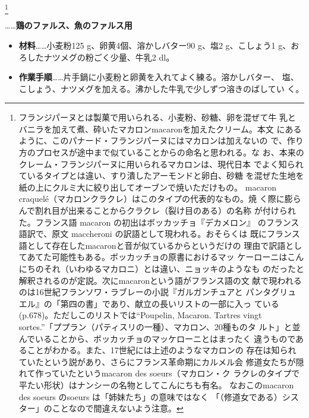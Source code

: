\begin{recette}
\footnote{フランジパーヌとは製菓で用いられる、小麦粉、砂糖、卵を混ぜて牛
  乳とバニラを加えて煮、砕いたマカロンmacaronを加えたクリーム。本文
  にあるように、このパナード・フランジパーヌにはマカロンは加えないの
  で、作り方のプロセスが途中まで似ていることからの命名と思われる。な
  お、本来のクレーム・フランジパーヌに用いられるマカロンは、現代日本
  でよく知られているタイプとは違い、すり潰したアーモンドと卵白、砂糖
  を混ぜた生地を紙の上にクルミ大に絞り出してオーブンで焼いただけもの。
  macaron craquelé（マカロンクラクレ）はこのタイプの代表的なもの。焼
  く際に膨らんで割れ目が出来ることからクラクレ（裂け目のある）の名称
  が付けられた。フランス語 macaron の初出はボッカッチョ『デカメロン』
  のフランス語訳で、原文 maccheroni の訳語として現われる。おそらくは
  既にフランス語として存在したmacaronと音が似ているからというだけの
  理由で訳語としてあてた可能性もある。ボッカッチョの原書におけるマッ
  ケーローニはこんにちのそれ（いわゆるマカロニ）とは違い、ニョッキのようなも
  のだったと解釈されるのが定説。次にmacaronという語がフランス語の文
  献で現われるのは16世紀フランソワ・ラブレーの小説『ガルガンチュアと
  パンタグリュエル』の「第四の書」であり、献立の長いリストの一部に入っ
  ている(p.678)。ただしこのリストでは``Poupelin, Macaron. Tartres vingt
  sortes.''「ププラン（パティスリの一種）、マカロン、20種ものタ
  ルト」と並んでいることから、ボッカッチョのマッケローニとはまったく
  違うものであることがわかる。また、17世紀には上述のようなマカロンの
  存在は知られていたという説があり、さらにフランス革命期にカルメル会
  修道女たちが隠れて作っていたというmacaron des soeurs（マカロン・ク
  ラクレのタイプで平たい形状）はナンシーの名物としてこんにちも有名。
  なおこのmacaron des soeurs のsoeurs は「姉妹たち」の意味ではなく
  「（修道女である）シスター」のことなので間違えないよう注意。}


\ldots{}\ldots{}\textbf{鶏のファルス、魚のファルス用}

\begin{itemize}
\item
  \textbf{材料}\ldots{}\ldots{}小麦粉125 g、卵黄4個、溶かしバター90
  g、塩2 g、こしょう1 g、おろしたナツメグの粉ごく少量、牛乳2\undemi{}
  dl。
\item
  \textbf{作業手順}\ldots{}\ldots{}片手鍋に小麦粉と卵黄を入れてよく練る。溶かしバター、
  塩、こしょう、ナツメグを加える。沸かした牛乳で少しずつ溶きのばしてい
  く。
\end{itemize}


\end{recette}
